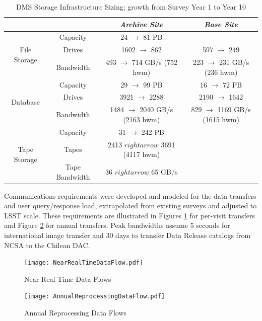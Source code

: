 \begin{table}
\centering
\begin{longtable}{|c|c|c|c|}
\hline
	& & \textit{Archive Site} & \textit{Base Site} \\ \hline
\multirow{3}{*}{File Storage} & Capacity & 24 $\rightarrow$ 81 PB & \\ \cline{2-4}
  & Drives & 1602 $\rightarrow$ 862 & 597 $\rightarrow$ 249 \\ \cline{2-4}
  & Bandwidth & 493 $\rightarrow$ 714 GB/s (752 hwm) & 223 $\rightarrow$ 231 GB/s (236 hwm) \\ \hline
\multirow{3}{*}{Database} & Capacity & 29 $\rightarrow$ 99 PB & 16 $\rightarrow$ 72 PB \\ \cline{2-4}
  & Drives & 3921 $\rightarrow$ 2288 & 2190 $\rightarrow$ 1642 \\ \cline{2-4}
  & Bandwidth & 1484 $\rightarrow$ 2040 GB/s (2163 hwm) & 829 $\rightarrow$ 1169 GB/s (1615 hwm) \\ \hline
\multirow{3}{*}{Tape Storage} & Capacity & 31 $\rightarrow$ 242 PB & \\ \cline{2-4}
  & Tapes & 2413 $rightarrow$ 3691 (4117 hwm) & \\ \cline{2-4}
  & Tape Bandwidth & 36 $rightarrow$ 65 GB/s & \\ \hline
\end{longtable}
\caption{DMS Storage Infrastructure Sizing; growth from Survey Year 1 to Year 10}
\label{table:storage-sizing}
\end{table}

Communications requirements were developed and modeled for the data transfers
and user query/response load, extrapolated from existing surveys and adjusted
to LSST scale.  These requirements are illustrated in Figures \ref{fig:near-real-time-flows} for per-visit transfers and Figure \ref{fig:annual-reprocessing-flows} for annual transfers.  Peak bandwidths assume 5 seconds for international
image transfer and 30 days to transfer Data Release catalogs from NCSA to the
Chilean DAC.

\begin{figure}
\centering
\texttt{[image: NearRealTimeDataFlow.pdf]}
\caption{Near Real-Time Data Flows}
\label{fig:near-real-time-flows}
\end{figure}

\begin{figure}
\centering
\texttt{[image: AnnualReprocessingDataFlow.pdf]}
\caption{Annual Reprocessing Data Flows}
\label{fig:annual-reprocessing-flows}
\end{figure}

